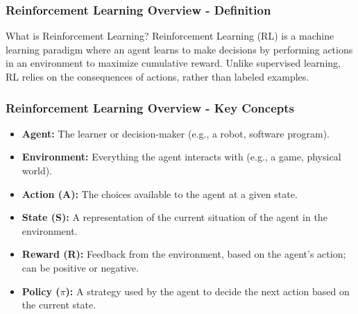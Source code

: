 \documentclass[aspectratio=169]{beamer}
\begin{document}
\begin{frame}[fragile]
    \frametitle{Reinforcement Learning Overview - Definition}
    \begin{block}{What is Reinforcement Learning?}
        Reinforcement Learning (RL) is a machine learning paradigm where an agent learns to make decisions by performing actions in an environment to maximize cumulative reward. 
        Unlike supervised learning, RL relies on the consequences of actions, rather than labeled examples.
    \end{block}
\end{frame}

\begin{frame}[fragile]
    \frametitle{Reinforcement Learning Overview - Key Concepts}
    \begin{itemize}
        \item \textbf{Agent:} The learner or decision-maker (e.g., a robot, software program).
        \item \textbf{Environment:} Everything the agent interacts with (e.g., a game, physical world).
        \item \textbf{Action (A):} The choices available to the agent at a given state.
        \item \textbf{State (S):} A representation of the current situation of the agent in the environment.
        \item \textbf{Reward (R):} Feedback from the environment, based on the agent's action; can be positive or negative.
        \item \textbf{Policy ($\pi$):} A strategy used by the agent to decide the next action based on the current state.
    \end{itemize}
\end{frame}
\end{document}
